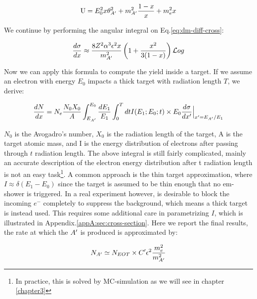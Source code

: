 \begin{equation}
  \label{eq:u-func}
  \textrm{U} = E^2_0 x \theta^2_{A'} + m^2_{A'} \frac{1 - x}{x} + m^2_e x
\end{equation}

We continue by performing the angular integral on Eq.\ref{eq:dm-diff-cross}:

\begin{equation}
  \label{eq:dm-diff-cross-int}
  \frac{d\sigma}{dx} \approx \frac{8 Z^2 \alpha^3 \epsilon^2 x}{m^2_{A'}} \left( 1 + \frac{x^2}{3(1-x)} \right) \mathcal{L}og 
\end{equation}

Now we can apply this formula to compute the yield inside a target. If we assume an electron with energy $E_0$ impacts a thick target with radiation length $T$, we derive:

\begin{equation}
  \label{eq:dm-general-yield}
  \frac{dN}{dx} = N_e \frac{N_0 X_0}{A} \int_{E_{A'}}^{E_0} \frac{dE_1}{E_1} \int_0^T dt I(E_1;E_0;t) \times E_0 \frac{d\sigma}{dx'}\Big|_{x' = E_{A'}/E_1}
\end{equation}

$N_0$ is the Avogadro's number, $X_0$ is the radiation length of the target, A is the target atomic mass, and I is the energy distribution of electrons after passing through $t$ radiation length. The above integral is still fairly complicated, mainly an accurate description of the electron energy distribution after t radiation length is not an easy task\footnote{In practice, this is solved by MC-simulation as we will see in chapter \ref{chapter3}}. A common approach is the thin target approximation, where $I \approx \delta (E_1 - E_0)$ since the target is assumed to be thin enough that no em-shower is triggered. In a real experiment however, is desirable to block the incoming $e^-$ completely to suppress the background, which means a thick target is instead used. This requires some additional care in parametrizing $I$, which is illustrated in Appendix.\ref{appA:sec:cross-section}. Here we report the final results, the rate at which the $A'$ is produced is approximated by:

\begin{equation}
  \label{eq:dm-rate}
  N_{A'} \simeq N_{EOT} \times C' \epsilon^2 \frac{m_e^2}{m^2_{A'}}
\end{equation}

